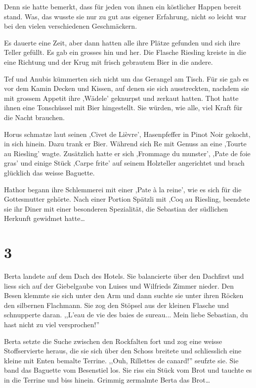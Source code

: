 Denn sie hatte bemerkt, dass für jeden von ihnen ein köstlicher Happen bereit stand. Was, das wusste sie nur zu gut aus eigener Erfahrung, nicht so leicht war bei den vielen verschiedenen Geschmäckern.

Es dauerte eine Zeit, aber dann hatten alle ihre Plätze gefunden und sich ihre Teller gefüllt. Es gab ein grosses hin und her. Die Flasche Riesling kreiste in die eine Richtung und der Krug mit frisch gebrautem Bier in die andere.

Tef und Anubis kümmerten sich nicht um das Gerangel am Tisch. Für sie gab es vor dem Kamin Decken und Kissen, auf denen sie sich ausstreckten, nachdem sie mit grossem Appetit ihre ,Wädele' geknurpst und zerkaut hatten. Thot hatte ihnen eine Tonschüssel mit Bier hingestellt. Sie würden, wie alle, viel Kraft für die Nacht brauchen.

Horus schmatze laut seinen ,Civet de Lièvre', Hasenpfeffer in Pinot Noir gekocht, in sich hinein. Dazu trank er Bier. Während sich Re mit Genuss an eine ,Tourte au Riesling' wagte. Zusätzlich hatte er sich ,Frommage du munster', ,Pate de foie gras' und einige Stück ,Carpe frite' auf seinem Holzteller angerichtet und brach glücklich das weisse Baguette.

Hathor begann ihre Schlemmerei mit einer ,Pate à la reine', wie es sich für die Gottesmutter gehörte. Nach einer Portion Spätzli mit ,Coq au Riesling, beendete sie ihr Diner mit einer besonderen Spezialität, die Sebastian der südlichen Herkunft gewidmet hatte\dots

\section*{3}

Berta landete auf dem Dach des Hotels. Sie balancierte über den Dachfirst und liess sich auf der Giebelgaube von Luises und Wilfrieds Zimmer nieder. Den Besen klemmte sie sich unter den Arm und dann suchte sie unter ihren Röcken den silbernen Flachmann. Sie zog den Stöpsel aus der kleinen Flasche und schnupperte daran. ,,L'eau de vie des baies de sureau... Mein liebe Sebastian, du hast nicht zu viel versprochen!'' 

Berta setzte die Suche zwischen den Rockfalten fort und zog eine weisse Stoffservierte heraus, die sie sich über den Schoss breitete und schliesslich eine kleine mit Enten bemalte Terrine. ,,Ouh, Rillettes de canard!'' seufzte sie. Sie band das Baguette vom Besenstiel los. Sie riss ein Stück vom Brot und tauchte es in die Terrine und biss hinein. Grimmig zermalmte Berta das Brot\dots 

